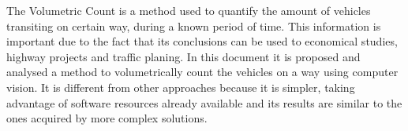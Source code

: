 
The Volumetric Count is a method used to quantify the amount of vehicles transiting on certain way, during a known period of time. This information is important due to the fact that its conclusions can be used to economical studies, highway projects and traffic planing. In this document it is proposed and analysed a method to volumetrically count the vehicles on a way using computer vision. It is different from other approaches because it is simpler, taking advantage of software resources already available and its results are similar to the ones acquired by more complex solutions.

